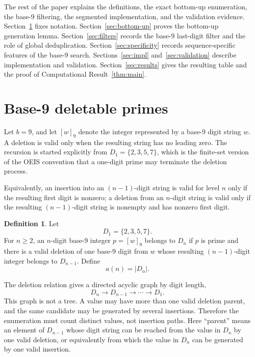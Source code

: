 \documentclass[11pt]{article}
\theoremstyle{definition}
\newtheorem{definition}{Definition}
\theoremstyle{remark}
\begin{document}
The rest of the paper explains the definitions, the exact bottom-up
enumeration, the base-9 filtering, the segmented implementation, and the
validation evidence.  Section~\ref{sec:def} fixes notation.
Section~\ref{sec:bottom-up} proves the bottom-up generation lemma.
Section~\ref{sec:filters} records the base-9 last-digit filter and the role
of global deduplication.  Section~\ref{sec:specificity} records
sequence-specific features of the base-9 search.  Sections~\ref{sec:impl}
and~\ref{sec:validation} describe implementation and validation.
Section~\ref{sec:results} gives the resulting table and the proof of
Computational Result~\ref{thm:main}.

\section{Base-9 deletable primes}
\label{sec:def}

Let \(b=9\), and let \([w]_9\) denote the integer represented by a base-9
digit string \(w\).  A deletion is valid only when the resulting string has
no leading zero.  The recursion is started explicitly from
\(D_1=\{2,3,5,7\}\), which is the finite-set version of the OEIS convention
that a one-digit prime may terminate the deletion process.

Equivalently, an insertion into an \((n-1)\)-digit string is valid for level
\(n\) only if the resulting first digit is nonzero; a deletion from an
\(n\)-digit string is valid only if the resulting \((n-1)\)-digit string is
nonempty and has nonzero first digit.

\begin{definition}
Let
\[
  D_1=\{2,3,5,7\}.
\]
For \(n\geq 2\), an \(n\)-digit base-9 integer \(p=[w]_9\) belongs to
\(D_n\) if \(p\) is prime and there is a valid deletion of one base-9 digit
from \(w\) whose resulting \((n-1)\)-digit integer belongs to \(D_{n-1}\).
Define
\[
  a(n)=|D_n|.
\]
\end{definition}

The deletion relation gives a directed acyclic graph by digit length,
\[
  D_n \longrightarrow D_{n-1}\longrightarrow \cdots \longrightarrow D_1.
\]
This graph is not a tree.  A value may have more than one valid deletion
parent, and the same candidate may be generated by several insertions.
Therefore the enumeration must count distinct values, not insertion paths.
Here ``parent'' means an element of \(D_{n-1}\) whose digit string can be
reached from the value in \(D_n\) by one valid deletion, or equivalently
from which the value in \(D_n\) can be generated by one valid insertion.
\end{document}
